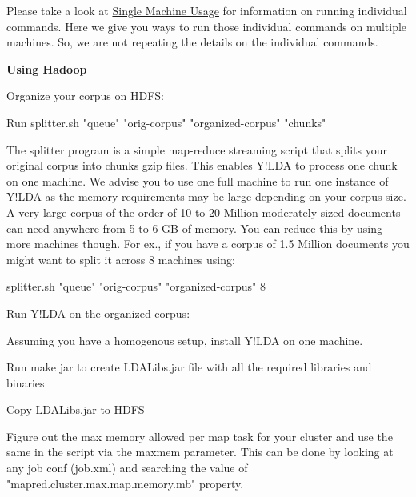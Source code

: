 Please take a look at \hyperlink{single__machine__usage}{Single Machine Usage} for information on running individual commands. Here we give you ways to run those individual commands on multiple machines. So, we are not repeating the details on the individual commands. 
\begin{DoxyEnumerate}
\item 

{\bfseries Using Hadoop} 
\begin{DoxyEnumerate}
\item 

Organize your corpus on HDFS: 
\begin{DoxyEnumerate}
\item 

Run {\ttfamily splitter.sh "queue" "orig-\/corpus" "organized-\/corpus" "chunks"} 

The splitter program is a simple map-\/reduce streaming script that splits your original corpus into chunks gzip files. This enables Y!LDA to process one chunk on one machine. We advise you to use one full machine to run one instance of Y!LDA as the memory requirements may be large depending on your corpus size. A very large corpus of the order of 10 to 20 Million moderately sized documents can need anywhere from 5 to 6 GB of memory. You can reduce this by using more machines though. For ex., if you have a corpus of 1.5 Million documents you might want to split it across 8 machines using: 

{\ttfamily splitter.sh "queue" "orig-\/corpus" "organized-\/corpus" 8} 
\end{DoxyEnumerate}
\item 

Run Y!LDA on the organized corpus: 
\begin{DoxyEnumerate}
\item 

Assuming you have a homogenous setup, install Y!LDA on one machine. 
\item 

Run make jar to create LDALibs.jar file with all the required libraries and binaries 
\item 

Copy LDALibs.jar to HDFS 
\item 

Figure out the max memory allowed per map task for your cluster and use the same in the script via the maxmem parameter. This can be done by looking at any job conf (job.xml) and searching the value of "mapred.cluster.max.map.memory.mb" property. 
\item 


\end{DoxyEnumerate}
\end{DoxyEnumerate}
\end{DoxyEnumerate}
